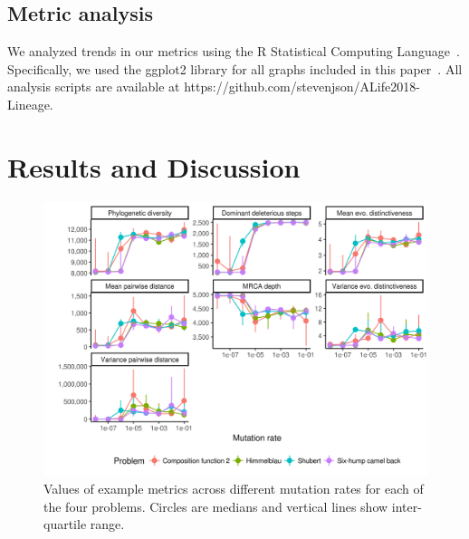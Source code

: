 \documentclass[letterpaper]{article}
\begin{document}
\subsection{Metric analysis}

We analyzed trends in our metrics using the R Statistical Computing Language~\citep{r_core_team_r:_2017}. Specifically, we used the ggplot2 library for all graphs included in this paper~\citep{wickham_ggplot2:_2009}. All analysis scripts are available at https://github.com/stevenjson/ALife2018-Lineage.

\section{Results and Discussion}
\begin{figure}
\includegraphics[width=7in]{figs/all_mutation_rate.png}
\caption{Values of example metrics across different mutation rates for each of the four problems. Circles are medians and vertical lines show inter-quartile range.}
\end{figure}



\end{document}
